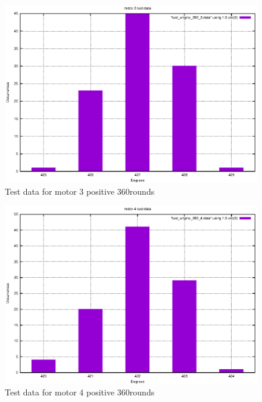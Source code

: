 \begin{figure}[ht]
  \includegraphics{graphics/test_graphs/test_engine_360_3.eps}
  \caption{Test data for motor 3 positive 360\textdegree rounds}
  \centering
  \label{fig:td_m3}
\end{figure}

\begin{figure}[ht]
  \includegraphics{graphics/test_graphs/test_engine_360_4.eps}
  \caption{Test data for motor 4 positive 360\textdegree rounds}
  \centering
  \label{fig:td_m4}
\end{figure}


